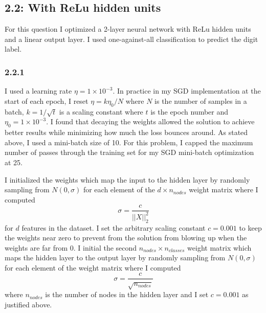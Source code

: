 \documentclass[12pt]{amsart}
\begin{document}
\subsection*{2.2: With ReLu hidden units}
For this question I optimized a 2-layer neural network with ReLu hidden units and a linear output layer.  I used one-against-all classification to predict the digit label.

\subsubsection*{2.2.1}
I used a learning rate $\eta = 1 \times 10^{-3}$.  In practice in my SGD implementation at the start of each epoch, I reset $\eta = k\eta_0/N$ where $N$ is the number of samples in a batch, $k = 1/\sqrt{t}$ is a scaling constant where $t$ is the epoch number and $\eta_0 = 1 \times 10^{-3}$.  I found that decaying the weights allowed the solution to achieve better results while minimizing how much the loss bounces around.   As stated above, I used a mini-batch size of 10.  For this problem, I capped the maximum number of passes through the training set for my SGD mini-batch optimization at 25.

I initialized the weights which map the input to the hidden layer by randomly sampling from $N(0,\sigma)$ for each element of the $d \times n_{nodes}$ weight matrix where I computed 
\begin{equation}
\sigma = \frac{c}{||X||^2_2}
\end{equation}
for $d$ features in the dataset.  I set the arbitrary scaling constant $c = 0.001$ to keep the weights near zero to prevent from the solution from blowing up when the weights are far from 0.  I initial the second $n_{nodes} \times n_{classes}$ weight matrix which maps the hidden layer to the output layer by randomly sampling from $N(0,\sigma)$ for each element of the weight matrix where I computed 
\begin{equation}
\sigma = \frac{c}{\sqrt{n_{nodes}}}
\end{equation}
where $n_{nodes}$ is the number of nodes in the hidden layer and I set $c = 0.001$ as justified above.
\end{document}
